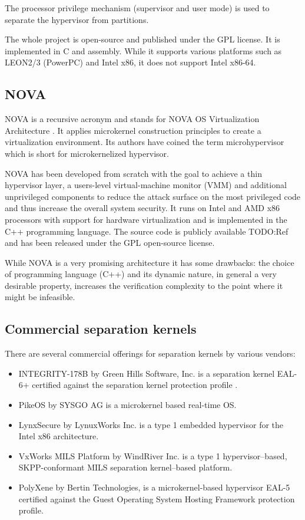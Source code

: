 The processor privilege mechanism (supervisor and user mode) is used to
separate the hypervisor from partitions.

The whole project is open-source and published under the GPL license. It is
implemented in C and assembly. While it supports various platforms such as
LEON2/3 (PowerPC) and Intel x86, it does not support Intel x86-64.

\subsection{NOVA}
NOVA is a recursive acronym and stands for NOVA OS Virtualization Architecture
\cite{Steinberg:2010:NMS:1755913.1755935}. It applies microkernel construction
principles to create a virtualization environment. Its authors have coined
the term microhypervisor which is short for
microkernelized hypervisor.

NOVA has been developed from scratch with the goal to achieve a thin hypervisor
layer, a users-level virtual-machine monitor (VMM) and additional unprivileged
components to reduce the attack surface on the most privileged code and thus
increase the overall system security. It runs on Intel and AMD x86 processors
with support for hardware virtualization and is implemented in the C++
programming language. The source code is publicly available TODO:Ref and has
been released under the GPL open-source license.

While NOVA is a very promising architecture it has some drawbacks: the choice of
programming language (C++) and its dynamic nature, in general a very desirable
property, increases the verification complexity to the point where it might be
infeasible.

\subsection{Commercial separation kernels}\label{subsec:commercial-sks}
There are several commercial offerings for separation kernels by various
vendors:

\begin{itemize}
	\item INTEGRITY-178B by Green Hills Software, Inc. is a separation kernel
		EAL-6+ certified against the separation kernel protection profile
		\cite{SKPP}.
	\item PikeOS by SYSGO AG is a microkernel based real-time OS.
	\item LynxSecure by LynuxWorks Inc. is a type 1 embedded hypervisor for the
		Intel x86 architecture.
	\item VxWorks MILS Platform by WindRiver Inc. is a type 1 hypervisor–based,
		SKPP-conformant MILS separation kernel–based platform.
	\item PolyXene by Bertin Technologies, is a microkernel-based hypervisor
		EAL-5 certified against the Guest Operating System Hosting Framework
		protection profile.
\end{itemize}

